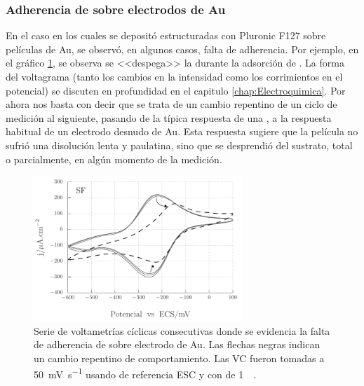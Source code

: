 		\subsubsection{Adherencia de \pdm\space sobre electrodos de Au}

			En el caso en los cuales se depositó \pdm\space estructuradas con Pluronic F127 sobre películas de Au, se observó, en algunos casos, falta de adherencia. Por ejemplo, en el gráfico \ref{fig:adherencia_F127}, se observa se <<despega>> la \pdm\space durante la adsorción de \aminorutenio. La forma del voltagrama (tanto los cambios en la intensidad como los corrimientos en el potencial) se discuten en profundidad en el capitulo \ref{chap:Electroquimica}. Por ahora nos basta con decir que se trata de un cambio repentino de un ciclo de medición al siguiente, pasando de la típica respuesta de una \pdm, a la respuesta habitual de un electrodo desnudo de Au. Esta respuesta sugiere que la película no sufrió una disolución lenta y paulatina, sino que se desprendió del sustrato, total o parcialmente, en algún momento de la medición.
			
				\begin{figure}[th]
				 	   	    \begin{center} 
				        	\includegraphics[width=0.70\textwidth]{Graficos/Adherencia_F127.pdf}
				       		\caption[Adherencia de \pdmF \space sobre una película delgada de Au.]{Serie de voltametrías cíclicas consecutivas donde se evidencia la falta de adherencia de \pdmF\space sobre electrodo de Au. Las flechas negras indican un cambio repentino de comportamiento. Las VC fueron tomadas a \SI{50}{\milli\volt.\second^{-1}} usando de referencia ESC y con de \ru\space \SI{1}{\milli\Molar}.}
				         	\label{fig:adherencia_F127}
				     		\end{center}
				     		\end{figure}

